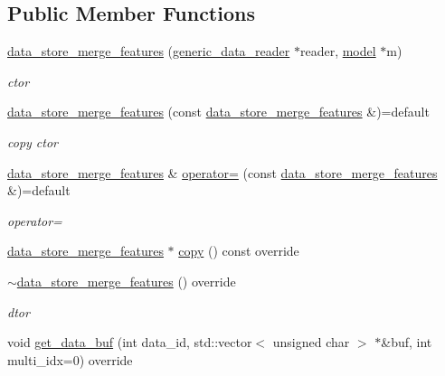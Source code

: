 \subsection*{Public Member Functions}
\begin{DoxyCompactItemize}
\item 
\hyperlink{classlbann_1_1data__store__merge__features_a4a2d9d0460f657a38397cf3a48c4d83e}{data\+\_\+store\+\_\+merge\+\_\+features} (\hyperlink{classlbann_1_1generic__data__reader}{generic\+\_\+data\+\_\+reader} $\ast$reader, \hyperlink{classlbann_1_1model}{model} $\ast$m)
\begin{DoxyCompactList}\small\item\em ctor \end{DoxyCompactList}\item 
\hyperlink{classlbann_1_1data__store__merge__features_af7b5c97c849f1d005ce738dacd53bd7a}{data\+\_\+store\+\_\+merge\+\_\+features} (const \hyperlink{classlbann_1_1data__store__merge__features}{data\+\_\+store\+\_\+merge\+\_\+features} \&)=default
\begin{DoxyCompactList}\small\item\em copy ctor \end{DoxyCompactList}\item 
\hyperlink{classlbann_1_1data__store__merge__features}{data\+\_\+store\+\_\+merge\+\_\+features} \& \hyperlink{classlbann_1_1data__store__merge__features_a5c44079726232d7c015f650dcd7f52ca}{operator=} (const \hyperlink{classlbann_1_1data__store__merge__features}{data\+\_\+store\+\_\+merge\+\_\+features} \&)=default
\begin{DoxyCompactList}\small\item\em operator= \end{DoxyCompactList}\item 
\hyperlink{classlbann_1_1data__store__merge__features}{data\+\_\+store\+\_\+merge\+\_\+features} $\ast$ \hyperlink{classlbann_1_1data__store__merge__features_a00a6f7e1f07b5bc65d98c835925d1e08}{copy} () const override
\item 
\hyperlink{classlbann_1_1data__store__merge__features_ade3b7b138376880121d16f40255e5f54}{$\sim$data\+\_\+store\+\_\+merge\+\_\+features} () override
\begin{DoxyCompactList}\small\item\em dtor \end{DoxyCompactList}\item 
void \hyperlink{classlbann_1_1data__store__merge__features_ac95dff58de75fba572f34d56ceec3732}{get\+\_\+data\+\_\+buf} (int data\+\_\+id, std\+::vector$<$ unsigned char $>$ $\ast$\&buf, int multi\+\_\+idx=0) override

\end{DoxyCompactItemize}
